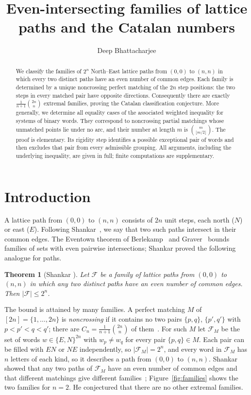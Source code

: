 \documentclass[screen]{aomart}
\title[Even-intersecting lattice paths]{Even-intersecting families of lattice paths and the Catalan numbers}
\author{Deep Bhattacharjee}
\newtheorem*{shankarthm}{Theorem}
\theoremstyle{definition}
\theoremstyle{remark}
\numberwithin{equation}{section}
\begin{document}
\begin{abstract}
We classify the families of $2^n$ North--East lattice paths from $(0,0)$ to $(n,n)$ in which every two distinct paths have an even number of common edges. Each family is determined by a unique noncrossing perfect matching of the $2n$ step positions: the two steps in every matched pair have opposite directions. Consequently there are exactly $\frac1{n+1}\binom{2n}{n}$ extremal families, proving the Catalan classification conjecture. More generally, we determine all equality cases of the associated weighted inequality for systems of binary words. They correspond to noncrossing partial matchings whose unmatched points lie under no arc, and their number at length $m$ is $\binom m{\lfloor m/2\rfloor}$. The proof is elementary. Its rigidity step identifies a possible exceptional pair of words and then excludes that pair from every admissible grouping. All arguments, including the underlying inequality, are given in full; finite computations are supplementary.
\end{abstract}
\maketitle
\section{Introduction}

A lattice path from $(0,0)$ to $(n,n)$ consists of $2n$ unit steps, each north ($N$) or east ($E$). Following Shankar~\cite{Sh}, we say that two such paths intersect in their common edges. The Eventown theorem of Berlekamp~\cite{Be} and Graver~\cite{Gr} bounds families of sets with even pairwise intersections; Shankar proved the following analogue for paths.

\begin{shankarthm}[Shankar {\cite[Theorem~1.4]{Sh}}]
Let $\mathcal F$ be a family of lattice paths from $(0,0)$ to $(n,n)$ in which any two distinct paths have an even number of common edges. Then $|\mathcal F|\le 2^n$.
\end{shankarthm}

The bound is attained by many families. A perfect matching $M$ of $[2n]=\{1,\dots,2n\}$ is \emph{noncrossing} if it contains no two pairs $\{p,q\}$, $\{p',q'\}$ with $p<p'<q<q'$; there are $C_n=\frac1{n+1}\binom{2n}{n}$ of them~\cite{St}. For such $M$ let $\mathcal F_M$ be the set of words $w\in\{E,N\}^{2n}$ with $w_p\ne w_q$ for every pair $\{p,q\}\in M$. Each pair can be filled with $EN$ or $NE$ independently, so $|\mathcal F_M|=2^n$, and every word in $\mathcal F_M$ has $n$ letters of each kind, so it describes a path from $(0,0)$ to $(n,n)$. Shankar showed that any two paths of $\mathcal F_M$ have an even number of common edges and that different matchings give different families~\cite[Section~4]{Sh}; Figure~\ref{fig:families} shows the two families for $n=2$. He conjectured that there are no other extremal families.
\end{document}
